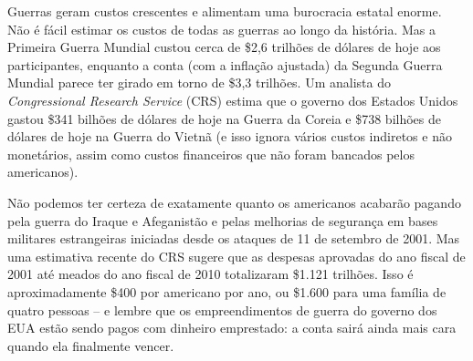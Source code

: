 Guerras geram custos crescentes e alimentam uma burocracia estatal enorme. Não é fácil estimar os custos de todas as guerras ao longo da história. Mas a Primeira Guerra Mundial custou cerca de \$2,6 trilhões de dólares de hoje aos participantes, enquanto a conta (com a inflação ajustada) da Segunda Guerra Mundial parece ter girado em torno de \$3,3 trilhões. Um analista do \emph{Congressional Research Service} (CRS) estima que o governo dos Estados Unidos gastou \$341 bilhões de dólares de hoje na Guerra da Coreia e \$738 bilhões de dólares de hoje na Guerra do Vietnã (e isso ignora vários custos indiretos e não monetários, assim como custos financeiros que não foram bancados pelos americanos).

Não podemos ter certeza de exatamente quanto os americanos acabarão pagando pela guerra do Iraque e Afeganistão e pelas melhorias de segurança em bases militares estrangeiras iniciadas desde os ataques de 11 de setembro de 2001. Mas uma estimativa recente do CRS sugere que as despesas aprovadas do ano fiscal de 2001 até meados do ano fiscal de 2010 totalizaram \$1.121 trilhões. Isso é aproximadamente \$400 por americano por ano, ou \$1.600 para uma família de quatro pessoas -- e lembre que os empreendimentos de guerra do governo dos EUA estão sendo pagos com dinheiro emprestado: a conta sairá ainda mais cara quando ela finalmente vencer.

